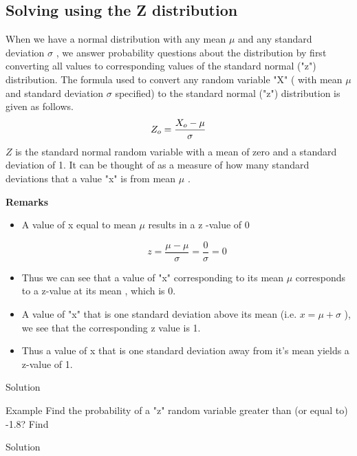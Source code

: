 \documentclass[]{report}
\begin{document}

\subsection{Solving using the Z distribution}
When we have a normal distribution with any mean $\mu$ and any standard deviation $\sigma$ , we answer probability questions about the distribution by first converting all values to corresponding values of the standard normal ("z") distribution.
The formula used to convert any random variable "X" ( with mean $\mu$ and standard deviation $\sigma$ specified) to the standard normal ("z") distribution is given as follows.
\[ Z_o = {X_o - \mu \over \sigma} \]
$Z$ is the standard normal random variable with a mean of zero and a standard deviation of 1.
It can be thought of as a measure of how many standard deviations that a value "x" is from mean $\mu$ .


\noindent \textbf{Remarks}

\begin{itemize}
\item A value of x equal to mean $\mu$  results in a z -value of 0

\[ z = \frac{\mu - \mu}{\sigma} = \frac{0}{\sigma} = 0\]


\item Thus we can see that a value of "x" corresponding to its mean $\mu$ corresponds to a z-value at its mean , which is 0.

\item A value of "x" that is one standard deviation above its mean (i.e. $x=\mu +\sigma$  ), we see that the corresponding z value is 1.


\item Thus a value of x that is one standard deviation away from it's mean yields a z-value of 1.
\end{itemize}








Solution 



Example 
Find the probability of a "z" random variable greater than (or equal to) -1.8?
Find  

Solution
\end{document}
